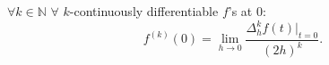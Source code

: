 \documentclass[a4paper,12pt]{article}
\begin{document}


\begin{theorem}
    $\forall k \in \mathbb{N}$ $\forall$  $k$-continuously differentiable $f$'s at $0$:
    \begin{equation}
        f^{(k)}(0) = \lim_{h \to 0} \frac{\Delta^{k}_{h} f(t)|_{t=0}}{(2h)^{k}}.
    \end{equation}
\end{theorem}
\end{document}
